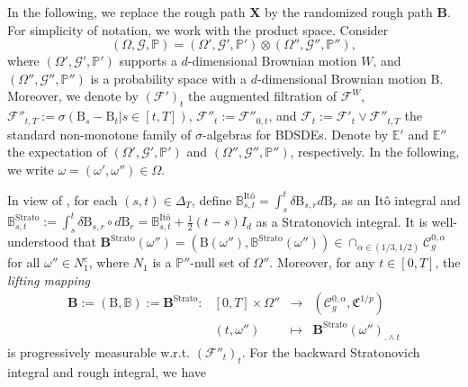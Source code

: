 \documentclass[11pt,reqno]{amsart}
\newcommand{\FP}{{\mathfrak{P}}}
\newcommand{\FC}{{\mathfrak{C}}}
\newcommand{\BX}{{\mathbf{X}}}
\newcommand{\BB}{{\mathbf{B}}}
\newcommand{\MF}{{\mathcal{F}}}
\newcommand{\MG}{{\mathcal{G}}}
\numberwithin{equation}{section}
\def\PP{{\mathbb P}}
\def\E{\mathbb E}
\begin{document}
In the following, we replace the rough path $\BX$ by the randomized rough path $\BB$. For simplicity of notation, we work with the product space. 
Consider 
\begin{equation}  \label{sec51productbasis}
( {\Omega}, \MG, \PP)  = (\Omega', \MG',\PP') \otimes (\Omega'', \MG'', \PP''),
\end{equation} 
where $(\Omega', \MG',\PP')$ supports a $d$-dimensional Brownian motion $W$, %
and $(\Omega'', \MG'',\PP'')$ is a probability space with a $d$-dimensional Brownian motion $\mathrm B$. Moreover, we denote by $(\MF')_t$ the augmented filtration of $\MF^W$, $\MF''_{t,T}:= \sigma(\mathrm B_s- \mathrm B_t| s\in [t,T])$, $\MF''_t:=\MF''_{0,t}$, and $\MF_t:= \MF'_t \vee \MF''_{t,T}$ the standard non-monotone family of $\sigma$-algebras for BDSDEs. Denote by $\E'$ and $\E''$ the expectation of $(\Omega',\mathcal G',\mathbb P')$ and $(\Omega'',\mathcal G'',\mathbb P'')$, respectively. In the following, we write $\omega = (\omega',\omega'') \in \Omega$.

In view of \cite[Chapter~3]{friz2020course}, for each $(s,t)\in \Delta_T$, define $\mathbb{B}^{\text{It\^o}}_{s,t}=\int_s^t \delta \mathrm B_{s,r}d\mathrm B_r$ as an It\^o integral and $\mathbb{B}_{s,t}^{\mathrm{Strato}}:=\int_s^t \delta \mathrm B_{s,r}\circ d\mathrm B_r=\mathbb{B}^{\text{It\^o}}_{s,t}+\frac12 (t-s)I_d$ as a Stratonovich integral.
It is well-understood that $\BB^{\mathrm{Strato}}(\omega'')=(\mathrm B(\omega''),\mathbb{B}^{\mathrm{Strato}}(\omega'')) \in \cap_{\alpha\in(1/3,1/2)} \mathscr{C}^{0,\alpha}_g $ for all $\omega''\in N_1^c$, where $N_1$ is a $\PP''$-null set of $\Omega''$. Moreover, for any $t\in[0,T]$, the {\it lifting mapping} 
\begin{equation}\label{ito-lift}
\begin{array}{llll}
\BB := (\mathrm B, \mathbb B) := \BB^{\mathrm{Strato} }: & [0,T]\times \Omega'' & \rightarrow & (\mathscr{C}^{0,\alpha}_g, \FC^{1/p})	\\[2mm]
 & (t,\omega'') &\mapsto & \BB^{\mathrm{Strato} } (\omega'')_{.\wedge t}
 \end{array}   
\end{equation} 
is progressively measurable w.r.t. $(\MF''_t )_t$. For the backward Stratonovich integral and rough integral, we have
\end{document}
